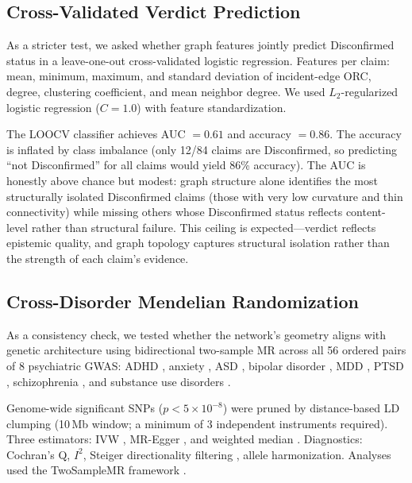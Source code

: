 \documentclass[11pt]{article}
\begin{document}
\subsection{Cross-Validated Verdict Prediction}
\label{sec:prediction}

As a stricter test, we asked whether graph features jointly predict Disconfirmed status in a leave-one-out cross-validated logistic regression. Features per claim: mean, minimum, maximum, and standard deviation of incident-edge ORC, degree, clustering coefficient, and mean neighbor degree. We used $L_2$-regularized logistic regression ($C = 1.0$) with feature standardization.

The LOOCV classifier achieves AUC $= 0.61$ and accuracy $= 0.86$. The accuracy is inflated by class imbalance (only 12/84 claims are Disconfirmed, so predicting ``not Disconfirmed'' for all claims would yield 86\% accuracy). The AUC is honestly above chance but modest: graph structure alone identifies the most structurally isolated Disconfirmed claims (those with very low curvature and thin connectivity) while missing others whose Disconfirmed status reflects content-level rather than structural failure. This ceiling is expected---verdict reflects epistemic quality, and graph topology captures structural isolation rather than the strength of each claim's evidence.

\subsection{Cross-Disorder Mendelian Randomization}
\label{sec:mr}

As a consistency check, we tested whether the network's geometry aligns with genetic architecture using bidirectional two-sample MR across all 56 ordered pairs of 8 psychiatric GWAS: ADHD \citep{demontis2023genome}, anxiety \citep{levey2020reproducible}, ASD \citep{grove2019identification}, bipolar disorder \citep{mullins2021genome}, MDD \citep{als2023depression}, PTSD \citep{nievergelt2024genome}, schizophrenia \citep{trubetskoy2022mapping}, and substance use disorders \citep{hatoum2023multivariate}.

Genome-wide significant SNPs ($p < 5 \times 10^{-8}$) were pruned by distance-based LD clumping (10\,Mb window; a minimum of 3 independent instruments required). Three estimators: IVW \citep{burgess2013mendelian}, MR-Egger \citep{bowden2015mendelian}, and weighted median \citep{bowden2016consistent}. Diagnostics: Cochran's Q, $I^2$, Steiger directionality filtering \citep{hemani2017orienting}, allele harmonization. Analyses used the TwoSampleMR framework \citep{hemani2018mrbase}.
\end{document}
